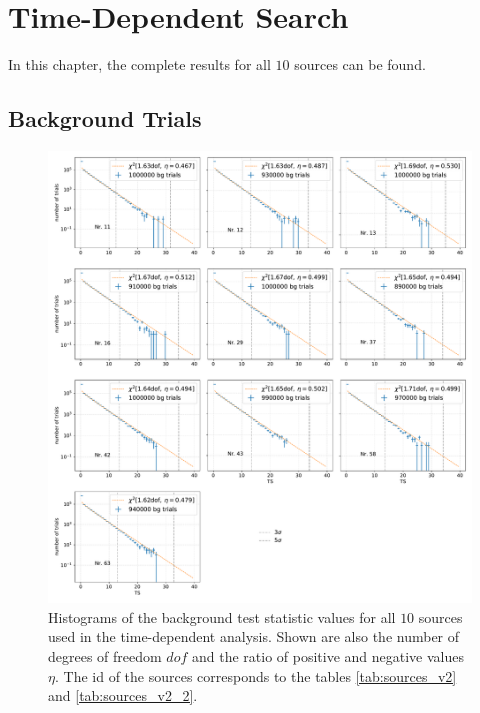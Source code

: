 \section{Time-Dependent Search} \label{sec:time_dep_search_appendix}

In this chapter, the complete results for all $\num{10}$ sources can be found.

\subsection{Background Trials}

\begin{figure}
    \centering
    \includegraphics[width=\linewidth-2cm]{Plots/05_csky/9_years_gfu_gold_time_dep_bg_t0.pdf}
    \caption{Histograms of the background test statistic values for all $\num{10}$ sources used in the time-dependent analysis. Shown are also the number of degrees of freedom $dof$ and the ratio of positive and negative values $\eta$. The id of the sources corresponds to the tables \ref{tab:sources_v2} and \ref{tab:sources_v2_2}.}
    \label{fig:bg_trials_time_dep}
\end{figure}

